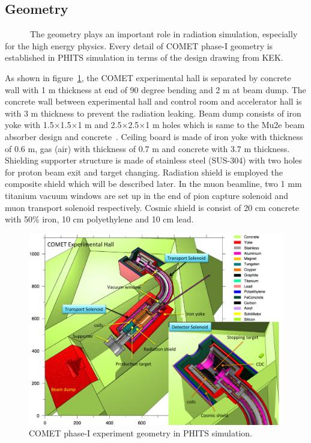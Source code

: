   \subsection{Geometry}
~~~~~~The geometry plays an important role in radiation simulation, especially for the high energy physics.
Every detail of COMET phase-I geometry is established in PHITS simulation in terms of the design drawing from KEK.

As shown in figure~\ref{geom}, the COMET experimental hall is separated by concrete wall with 1 m thickness at end of 90 degree bending and 2 m at beam dump.
The concrete wall between experimental hall and control room and accelerator hall is with 3 m thickness to prevent the radiation leaking.
Beam dump consists of iron yoke with 1.5$\times$1.5$\times$1 m and 2.5$\times$2.5$\times$1 m holes which is same to the Mu2e beam absorber design and concrete~\cite{mu2ereport}.
Ceiling board is made of iron yoke with thickness of 0.6 m, gas (air) with thickness of 0.7 m and concrete with 3.7 m thickness.
Shielding supporter structure is made of stainless steel (SUS-304) with two holes for proton beam exit and target changing.
Radiation shield is employed the composite shield which will be described later.
In the muon beamline, two 1 mm titanium vacuum windows are set up in the end of pion capture solenoid and muon transport solenoid respectively.
Cosmic shield is consist of 20 cm concrete with 50\% iron, 10 cm polyethylene and 10 cm lead.
 \begin{figure}[H]
   \centering
   \includegraphics[scale=0.5]{chapter3/fig/geo.pdf}
   \caption{COMET phase-I experiment geometry in PHITS simulation.}
   \label{geom}
  \end{figure}

